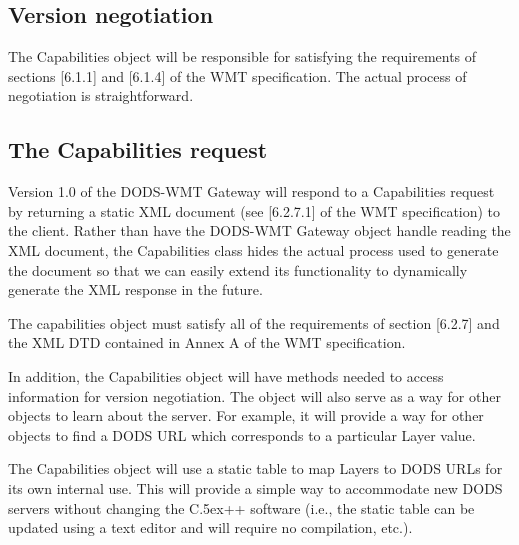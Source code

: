 \documentclass{article}
\newcommand{\Cpp}{{\rm {\small C}\raise.5ex\hbox{\footnotesize ++}}\xspace}
\begin{document}
\subsection{Version negotiation}
\label{sec:negotiation}
The Capabilities object will be responsible for satisfying the requirements of
sections [6.1.1] and [6.1.4] of the WMT specification. The actual process of
negotiation is straightforward.

\subsection{The Capabilities request}
\label{sec:capability}

%

Version 1.0 of the DODS-WMT Gateway will respond to a Capabilities
request by returning a static XML document (see [6.2.7.1] of the 
WMT specification) to the client.  Rather than have the DODS-WMT 
Gateway object handle reading the XML document, the 
Capabilities class hides the actual process
used to generate the document so that we can easily extend its 
functionality to dynamically generate the XML response in the future.

The capabilities object must satisfy all of the requirements of section
[6.2.7] and the XML DTD contained in Annex A of the WMT specification.

In addition, the Capabilities object will have methods needed to access
information for version negotiation. The object will also serve as a way for
other objects to learn about the server. For example, it will provide a way
for other objects to find a DODS URL which corresponds to a particular Layer
value.

The Capabilities object will use a static table to map Layers to DODS URLs
for its own internal use. This will provide a simple way to accommodate new
DODS servers without changing the \Cpp software (i.e., the static table can be
updated using a text editor and will require no compilation, etc.).

\end{document}
